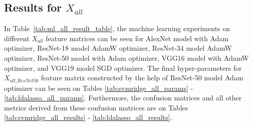 \subsection{Results for $X_{all}$} \label{CH6:results_xall}

In Table~\ref{tab:ml_all_result_table}, the machine learning experiments on different $X_{all}$ feature matrices can be seen for AlexNet model with Adam optimizer, ResNet-18 model AdamW optimizer, ResNet-34 model AdamW optimizer, ResNet-50 model with Adam optimizer, VGG16 model with AdamW optimizer, and VGG19 model SGD optimizer. The final hyper-parameters for $X_{all\_ResNet50}$ feature matrix constructed by the help of ResNet-50 model Adam optimizer can be seen on Tables \ref{tab:svmridge_all_params} - \ref{tab:ldalasso_all_params}. Furthermore, the confusion matrices and all other metrics derived from these confusion matrices are on Tables \ref{tab:svmridge_all_results} - \ref{tab:ldalasso_all_results}.


